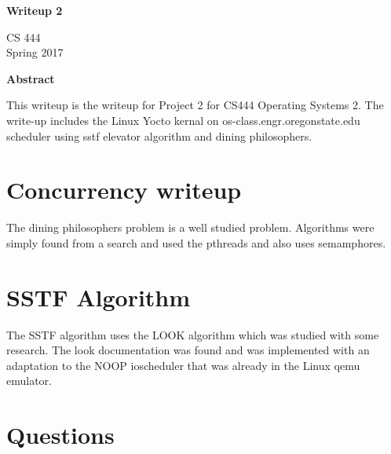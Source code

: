 \documentclass[letterpaper,10pt,titlepage]{article}
\begin{document}
\begin{titlepage}
    \begin{center}
        \vspace*{3.5cm}

        \textbf{Writeup 2}

        \vspace{0.5cm}
	
	\vspace{0.8cm}

        CS 444\\
        Spring 2017\\

        \vspace{1cm}

        \textbf{Abstract}\\

        \vspace{0.5cm}

	This writeup is the writeup for Project 2 for CS444 Operating Systems 2.  The write-up includes the Linux Yocto kernal on os-class.engr.oregonstate.edu scheduler using sstf elevator algorithm and dining philosophers.

        \vfill

    \end{center}
\end{titlepage}

\newpage

\tableofcontents

\newpage

\section{Concurrency writeup}
The dining philosophers problem is a well studied problem.  Algorithms were simply found from a search and used the pthreads and also uses semamphores.  

\section{SSTF Algorithm}
The SSTF algorithm uses the LOOK algorithm which was studied with some research. The look documentation was found and was implemented with an adaptation to the NOOP ioscheduler that was already in the Linux qemu emulator.

\section{Questions}
\end{document}
